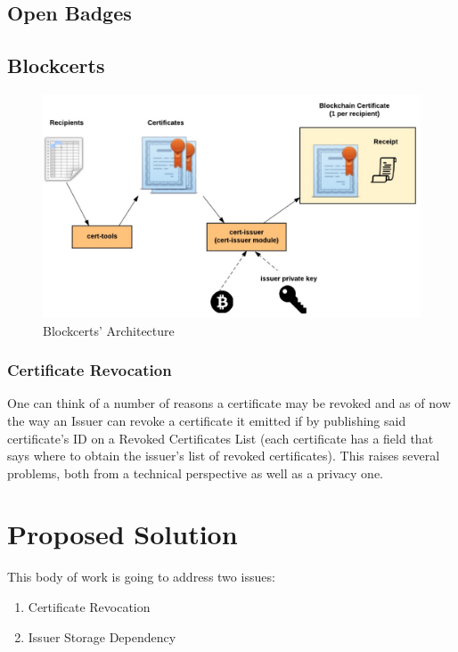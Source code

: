\documentclass[llncsdoc]{llncs}
\begin{document}
\subsection{Open Badges}

\subsection{Blockcerts}

\begin{figure}
  \includegraphics[width=\linewidth]{figures/blockcerts_arch.jpg}
  \caption{Blockcerts' Architecture}
  \label{fig:blockcerts_arch}
\end{figure}

\subsubsection{Certificate Revocation}
\label{revoked}
One can think of a number of reasons a certificate may be revoked and as of now the way an Issuer can revoke a certificate it emitted if by publishing said certificate's ID on a Revoked Certificates List (each certificate has a field that says where to obtain the issuer's list of revoked certificates). This raises several problems, both from a technical perspective as well as a privacy one.

\section{Proposed Solution}
This body of work is going to address two issues: 
\begin{enumerate}
    \item Certificate Revocation
    \item Issuer Storage Dependency
\end{enumerate}
\end{document}
